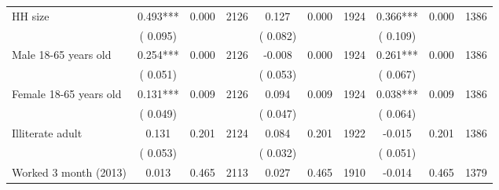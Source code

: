 \begin{tabular}{l*{9}{c}}
 HH size                 &              0.493***          &        0.000 & 2126          &              0.127 &        0.000 & 1924                   &        0.366*** &        0.000 & 1386                                 \\ 
                               &        (       0.095) & &                                                                 &       (       0.082) & &                                                          &       (       0.109) & &                                          \\ 
 Male 18-65 years old                 &              0.254***          &        0.000 & 2126          &             -0.008 &        0.000 & 1924                   &        0.261*** &        0.000 & 1386                                 \\ 
                               &        (       0.051) & &                                                                 &       (       0.053) & &                                                          &       (       0.067) & &                                          \\ 
 Female 18-65 years old                 &              0.131***          &        0.009 & 2126          &              0.094 &        0.009 & 1924                   &        0.038*** &        0.009 & 1386                                 \\ 
                               &        (       0.049) & &                                                                 &       (       0.047) & &                                                          &       (       0.064) & &                                          \\ 
 Illiterate adult                 &              0.131          &        0.201 & 2124          &              0.084 &        0.201 & 1922                   &       -0.015 &        0.201 & 1386                                 \\ 
                               &        (       0.053) & &                                                                 &       (       0.032) & &                                                          &       (       0.051) & &                                          \\ 
 Worked 3 month (2013)                 &              0.013          &        0.465 & 2113          &              0.027 &        0.465 & 1910                   &       -0.014 &        0.465 & 1379                                 \\ 

\end{tabular}

